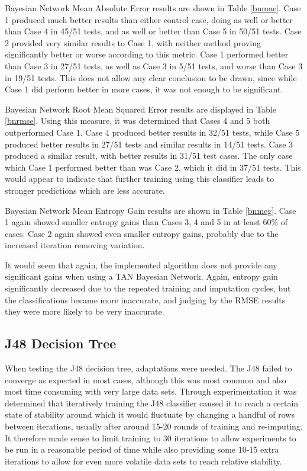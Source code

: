 Bayesian Network Mean Absolute Error results are shown in Table \ref{bnmae}. Case 1 produced much better results than either control case, doing as well or better than Case 4 in 45/51 tests, and as well or better than Case 5 in 50/51 tests. Case 2 provided very similar results to Case 1, with neither method proving significantly better or worse according to this metric. Case 1 performed better than Case 3 in 27/51 tests, as well as Case 3 in 5/51 tests, and worse than Case 3 in 19/51 tests. This does not allow any clear conclusion to be drawn, since while Case 1 did perform better in more cases, it was not enough to be significant.

Bayesian Network Root Mean Squared Error results are displayed in Table \ref{bnrmse}. Using this measure, it was determined that Cases 4 and 5 both outperformed Case 1. Case 4 produced better results in 32/51 tests, while Case 5 produced better results in 27/51 tests and similar results in 14/51 tests. Case 3 produced a similar result, with better results in 31/51 test cases. The only case which Case 1 performed better than was Case 2, which it did in 37/51 tests. This would appear to indicate that further training using this classifier leads to stronger predictions which are less accurate.

Bayesian Network Mean Entropy Gain results are shown in Table \ref{bnmeg}. Case 1 again showed smaller entropy gains than Cases 3, 4 and 5 in at least 60\% of cases. Case 2 again showed even smaller entropy gains, probably due to the increased iteration removing variation.

It would seem that again, the implemented algorithm does not provide any significant gains when using a TAN Bayesian Network. Again, entropy gain significantly decreased due to the repeated training and imputation cycles, but the classifications became more inaccurate, and judging by the RMSE results they were more likely to be very inaccurate.






\FloatBarrier

\subsection{J48 Decision Tree}
When testing the J48 decision tree, adaptations were needed. The J48 failed to converge as expected in most cases, although this was most common and also most time consuming with very large data sets. Through experimentation it was determined that iteratively training the J48 classifier caused it to reach a certain state of stability around which it would fluctuate by changing a handful of rows between iterations, usually after around 15-20 rounds of training and re-imputing. It therefore made sense to limit training to 30 iterations to allow experiments to be run in a reasonable period of time while also providing some 10-15 extra iterations to allow for even more volatile data sets to reach relative stability.

